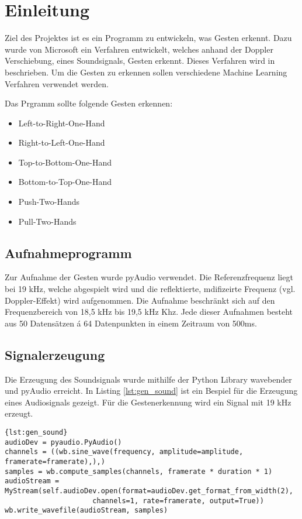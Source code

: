 \section{Einleitung}
Ziel des Projektes ist es ein Programm zu entwickeln, was Gesten erkennt. Dazu
wurde von Microsoft ein Verfahren entwickelt, welches anhand der Doppler
Verschiebung, eines Soundsignals, Gesten erkennt. Dieses Verfahren wird in
\cite{Gupta2012} beschrieben. Um die Gesten zu erkennen sollen verschiedene
Machine Learning Verfahren verwendet werden.

Das Prgramm sollte folgende Gesten erkennen:
\begin{itemize}
	\item Left-to-Right-One-Hand
	\item Right-to-Left-One-Hand
	\item Top-to-Bottom-One-Hand
	\item Bottom-to-Top-One-Hand
	\item Push-Two-Hands
	\item Pull-Two-Hands
\end{itemize}

\subsection{Aufnahmeprogramm}
\label{sec:gestures_dataformat}

Zur Aufnahme der Gesten wurde pyAudio verwendet. Die Referenzfrequenz liegt bei
19 kHz, welche abgespielt wird und die reflektierte, mdifizeirte Frequenz (vgl.
Doppler-Effekt) wird aufgenommen. Die Aufnahme beschränkt sich auf den
Frequenzbereich von 18,5 kHz bis 19,5 kHz Khz. Jede dieser Aufnahmen besteht aus
50 Datensätzen á 64 Datenpunkten in einem Zeitraum von 500ms. 

\subsection{Signalerzeugung}
Die Erzeugung des Soundsignals wurde mithilfe der Python Library wavebender und
pyAudio erreicht. In Listing \ref{lst:gen_sound} ist ein Bespiel für die
Erzeugung eines Audiosignals gezeigt. Für die Gestenerkennung wird ein Signal
mit 19 kHz erzeugt.

\begin{lstlisting}[caption={Erzeugung eines Soundsignals},label={lst:gen_sound}]{lst:gen_sound} 
audioDev = pyaudio.PyAudio()
channels = ((wb.sine_wave(frequency, amplitude=amplitude, framerate=framerate),),)
samples = wb.compute_samples(channels, framerate * duration * 1)
audioStream = MyStream(self.audioDev.open(format=audioDev.get_format_from_width(2),
					 channels=1, rate=framerate, output=True))
wb.write_wavefile(audioStream, samples)
\end{lstlisting}


\nocite{Gupta2012}